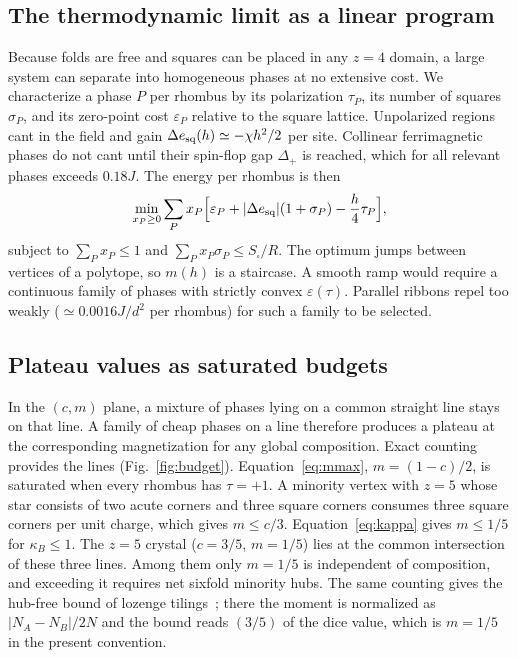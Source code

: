 \documentclass[aps,prb,twocolumn,superscriptaddress,floatfix]{revtex4-2}
\newcommand{\eps}{\varepsilon}
\begin{document}
\subsection{The thermodynamic limit as a linear program}

Because folds are free and squares can be placed in any $z=4$ domain, a large system can separate into homogeneous phases at no extensive cost. We characterize a phase $P$ per rhombus by its polarization $\tau_P$, its number of squares $\sigma_P$, and its zero-point cost $\eps_P$ relative to the square lattice. Unpolarized regions cant in the field and gain $\Delta e_{\rm sq}(h)\simeq-\chi h^2/2$ per site. Collinear ferrimagnetic phases do not cant until their spin-flop gap $\Delta_+$ is reached, which for all relevant phases exceeds $0.18J$. The energy per rhombus is then
\begin{equation}
\min_{x_P\ge0}\sum_P x_P\Big[\eps_P+|\Delta e_{\rm sq}|(1+\sigma_P)-\frac h4\tau_P\Big],
\label{eq:LP}
\end{equation}
subject to $\sum_Px_P\le1$ and $\sum_Px_P\sigma_P\le S_\square/R$. The optimum jumps between vertices of a polytope, so $m(h)$ is a staircase. A smooth ramp would require a continuous family of phases with strictly convex $\eps(\tau)$. Parallel ribbons repel too weakly ($\simeq0.0016J/d^2$ per rhombus) for such a family to be selected.

\subsection{Plateau values as saturated budgets}

In the $(c,m)$ plane, a mixture of phases lying on a common straight line stays on that line. A family of cheap phases on a line therefore produces a plateau at the corresponding magnetization for any global composition. Exact counting provides the lines (Fig.~\ref{fig:budget}). Equation~\eqref{eq:mmax}, $m=(1-c)/2$, is saturated when every rhombus has $\tau=+1$. A minority vertex with $z=5$ whose star consists of two acute corners and three square corners consumes three square corners per unit charge, which gives $m\le c/3$. Equation~\eqref{eq:kappa} gives $m\le1/5$ for $\kappa_B\le1$. The $z=5$ crystal ($c=3/5$, $m=1/5$) lies at the common intersection of these three lines. Among them only $m=1/5$ is independent of composition, and exceeding it requires net sixfold minority hubs. The same counting gives the hub-free bound of lozenge tilings~\cite{Yoo2026}; there the moment is normalized as $|N_A-N_B|/2N$ and the bound reads $(3/5)$ of the dice value, which is $m=1/5$ in the present convention.
\end{document}
